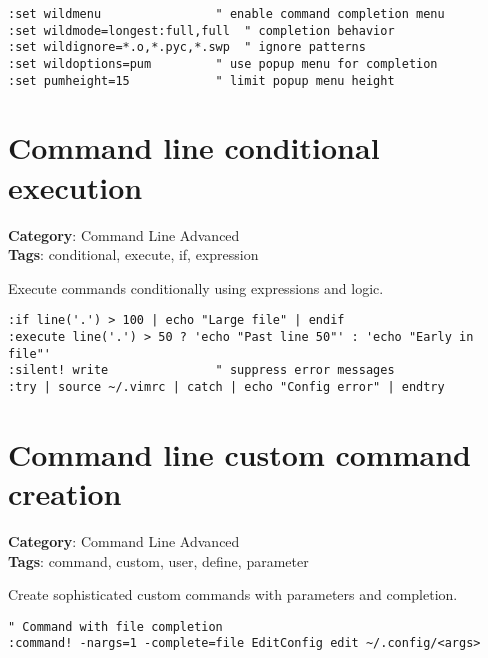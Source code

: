 {{{\begin{Exa*}{}
\begin{Verbatim}[fontsize=\footnotesize, breaklines, breakanywhere]
:set wildmenu                " enable command completion menu
:set wildmode=longest:full,full  " completion behavior
:set wildignore=*.o,*.pyc,*.swp  " ignore patterns
:set wildoptions=pum         " use popup menu for completion
:set pumheight=15            " limit popup menu height
\end{Verbatim}
\end{Exa*}

\section{Command line conditional execution}

\textbf{Category}: Command Line Advanced\\ \textbf{Tags}: conditional, execute, if, expression
\vspace{0.5cm}

Execute commands conditionally using expressions and logic.

\begin{Exa*}{}
\begin{Verbatim}[fontsize=\footnotesize, breaklines, breakanywhere]
:if line('.') > 100 | echo "Large file" | endif
:execute line('.') > 50 ? 'echo "Past line 50"' : 'echo "Early in file"'
:silent! write               " suppress error messages
:try | source ~/.vimrc | catch | echo "Config error" | endtry
\end{Verbatim}
\end{Exa*}

\section{Command line custom command creation}

\textbf{Category}: Command Line Advanced\\ \textbf{Tags}: command, custom, user, define, parameter
\vspace{0.5cm}

Create sophisticated custom commands with parameters and completion.

\begin{Exa*}{}
\begin{Verbatim}[fontsize=\footnotesize, breaklines, breakanywhere]
" Command with file completion
:command! -nargs=1 -complete=file EditConfig edit ~/.config/<args>


\end{Verbatim}
\end{Exa*}}}}
